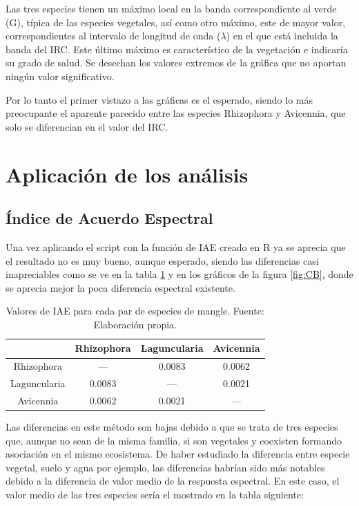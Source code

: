 Las tres especies tienen un máximo local en la banda correspondiente al verde (G), típica de las especies vegetales, así como otro máximo, este de mayor valor, correspondientes al intervalo de longitud de onda ($\lambda$) en el que está incluida la banda del \ac{IRC}. Este último máximo es característico de la vegetación e indicaría su grado de salud. Se desechan los valores extremos de la gráfica que no aportan ningún valor significativo.\Sep

Por lo tanto el primer vistazo a las gráficas es el esperado, siendo lo más preocupante el aparente parecido entre las especies Rhizophora y Avicennia, que solo se diferencian en el valor del \ac{IRC}.

\section{Aplicación de los análisis}
\subsection{Índice de Acuerdo Espectral}
Una vez aplicando el script con la función de \ac{IAE} creado en R ya se aprecia que el resultado no es muy bueno, aunque esperado, siendo las diferencias casi inapreciables como se ve en la tabla \ref{tab:Valores_IAE} y en los gráficos de la figura \ref{fig:CB}, donde se aprecia mejor la poca diferencia espectral existente.\Sep

\begin{table}[ht]
	\centering
	\caption[Valores de IAE]{Valores de \ac{IAE} para cada par de especies de mangle. Fuente: Elaboración propia.}
	\begin{tabular}{|c|c|c|c|}
	\hline
	& Rhizophora & Laguncularia & Avicennia \\
	\hline
	Rhizophora & --- & 0.0083 & 0.0062 \\
	\hline
	Laguncularia & 0.0083 & --- & 0.0021 \\
	\hline
	Avicennia & 0.0062 & 0.0021 & --- \\
	\hline
	\end{tabular}
	\label{tab:Valores_IAE}
\end{table}

Las diferencias en este método son bajas debido a que se trata de tres especies que, aunque no sean de la misma familia, si son vegetales y coexisten formando asociación en el mismo ecosistema. De haber estudiado la diferencia entre especie vegetal, suelo y agua por ejemplo, las diferencias habrían sido más notables debido a la diferencia de valor medio de la respuesta espectral. En este caso, el valor medio de las tres especies sería el mostrado en la tabla siguiente:

